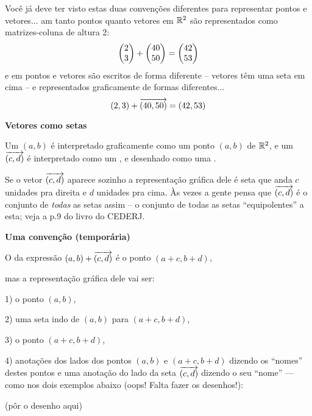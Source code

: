 \documentclass[oneside,12pt]{article}
\begin{document}
Você já deve ter visto estas duas convenções diferentes para
representar pontos e vetores... am  tanto
pontos quanto vetores em $\mathbb{R}^2$ são representados como matrizes-coluna
de altura 2:
%
$$\left (\begin{matrix}2\\3\end{matrix}\right ) + \left (\begin{matrix}40\\50\end{matrix}\right ) = \left (\begin{matrix}42\\53\end{matrix}\right )$$
%
e em  pontos e vetores são escritos de
forma diferente -- vetores têm uma seta em cima -- e representados
graficamente de formas diferentes...
%
$$(2,3) + {\overrightarrow{(40,50)}} = (42,53)$$
%


\newpage


{\bf Vetores como setas}

Um  $(a,b)$ é interpretado graficamente como um ponto
$(a,b)$ de $\mathbb{R}^2$, e um  ${\overrightarrow{(c,d)}}$ é interpretado
como um , e desenhado como uma .

Se o vetor ${\overrightarrow{(c,d)}}$ aparece sozinho a representação gráfica dele é
 seta que anda $c$ unidades pra direita e $d$
unidades pra cima. Às vezes a gente pensa que ${\overrightarrow{(c,d)}}$ é o conjunto
de {\sl todas} as setas assim -- o conjunto de todas as setas
``equipolentes'' a esta; veja a p.9 do livro do CEDERJ.

\newpage


{\bf Uma convenção (temporária)}

O  da expressão $(a,b)+{\overrightarrow{(c,d)}}$ é o ponto
$(a+c,b+d)$,

mas a representação gráfica dele vai ser:

1) o ponto $(a,b)$,

2) uma seta indo de $(a,b)$ para $(a+c,b+d)$,

3) o ponto $(a+c,b+d)$,

4) anotações dos lados dos pontos $(a,b)$ e $(a+c,b+d)$ dizendo os
``nomes'' destes pontos e uma anotação do lado da seta ${\overrightarrow{(c,d)}}$
dizendo o seu ``nome'' --- como nos dois exemplos abaixo (oops! Falta
fazer os desenhos!):

\msk

(pôr o desenho aqui)
\end{document}
